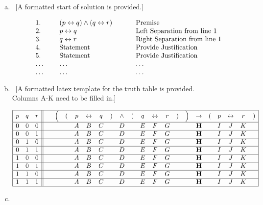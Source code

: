 \documentclass[12pt]{article}
\begin{document}
\begin{enumerate}[(a)]
\item \  [A formatted start of solution is provided.]

$$
\begin{array}{lclcl}
 1. & \ &  (p \leftrightarrow q) \wedge(q \leftrightarrow r)  &\hspace*{.2in} & \mbox{Premise}\\
 2. &   &  p \leftrightarrow q &     &  \mbox{Left Separation from line 1}\\
 3. &   &  q \leftrightarrow r &     &  \mbox{Right Separation from line 1 }\\
 4. &   &  \mbox{Statement}    &     & \mbox{Provide Justification}\\
 5. &   &  \mbox{Statement}    &     & \mbox{Provide Justification}\\
\ldots  &   &  \ldots          &     &  \ldots \\
\ldots  &   &  \ldots          &     &  \ldots \\
\end{array}
$$ 

\bigskip

\item\  [A formatted latex template for the truth table is provided.\\  Columns A-K need to be filled in.]

$$
\begin{array}{|ccc||cccccccccccccccccccc|} \hline
p & q &  r & \ &  \Bigl( &  ( & p & \leftrightarrow & q& ) &\wedge & ( & q & \leftrightarrow & r & ) & \Bigr) &\rightarrow & ( & p &\leftrightarrow &r & )\\\hline
0 & 0& 0 &&&& A & B & C && D && E &F& G  &&& {\bf H} && I & J & K &\\\hline
0 & 0& 1 &&&& A & B & C && D && E &F& G  &&& {\bf H} && I & J & K &\\\hline
0 & 1& 0 &&&& A & B & C && D && E &F& G  &&& {\bf H} && I & J & K &\\\hline
0 & 1& 1 &&&& A & B & C && D && E &F& G  &&& {\bf H} && I & J & K &\\\hline
1 & 0& 0 &&&& A & B & C && D && E &F& G  &&& {\bf H} && I & J & K &\\\hline
1 & 0& 1 &&&& A & B & C && D && E &F& G  &&& {\bf H} && I & J & K &\\\hline
1 & 1& 0 &&&& A & B & C && D && E &F& G  &&& {\bf H} && I & J & K &\\\hline
1 & 1& 1 &&&& A & B & C && D && E &F& G  &&& {\bf H} && I & J & K &\\\hline
\end{array}
$$

\item 
\end{enumerate}
\end{document}
